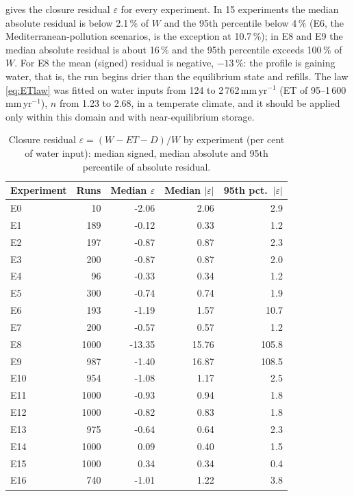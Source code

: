  gives the closure residual $\varepsilon$ for every experiment. In 15 experiments the median absolute residual is below 2.1\,\% of $W$ and the 95th percentile below 4\,\% (E6, the Mediterranean-pollution scenarios, is the exception at 10.7\,\%); in E8 and E9 the median absolute residual is about 16\,\% and the 95th percentile exceeds 100\,\% of $W$. For E8 the mean (signed) residual is negative, $-13\,\%$: the profile is gaining water, that is, the run begins drier than the equilibrium state and refills. The law \cref{eq:ETlaw} was fitted on water inputs from 124 to 2\,762\,mm\,yr$^{-1}$ (ET of 95--1\,600\,mm\,yr$^{-1}$), $n$ from 1.23 to 2.68, in a temperate climate, and it should be applied only within this domain and with near-equilibrium storage.

\begin{table}[H]\centering\small
\caption{Closure residual $\varepsilon=(W-\mathit{ET}-D)/W$ by experiment (per cent of water input): median signed, median absolute and 95th percentile of absolute residual.}
\label{tab:closure2}
\begin{tabular}{lrrrr}
\toprule
Experiment & Runs & Median $\varepsilon$ & Median $|\varepsilon|$ & 95th pct.\ $|\varepsilon|$\\\midrule
E0 & 10 & -2.06 & 2.06 & 2.9\\
E1 & 189 & -0.12 & 0.33 & 1.2\\
E2 & 197 & -0.87 & 0.87 & 2.3\\
E3 & 200 & -0.87 & 0.87 & 2.0\\
E4 & 96 & -0.33 & 0.34 & 1.2\\
E5 & 300 & -0.74 & 0.74 & 1.9\\
E6 & 193 & -1.19 & 1.57 & 10.7\\
E7 & 200 & -0.57 & 0.57 & 1.2\\
E8 & 1000 & -13.35 & 15.76 & 105.8\\
E9 & 987 & -1.40 & 16.87 & 108.5\\
E10 & 954 & -1.08 & 1.17 & 2.5\\
E11 & 1000 & -0.93 & 0.94 & 1.8\\
E12 & 1000 & -0.82 & 0.83 & 1.8\\
E13 & 975 & -0.64 & 0.64 & 2.3\\
E14 & 1000 & 0.09 & 0.40 & 1.5\\
E15 & 1000 & 0.34 & 0.34 & 0.4\\
E16 & 740 & -1.01 & 1.22 & 3.8\\
\bottomrule
\end{tabular}
\end{table}

